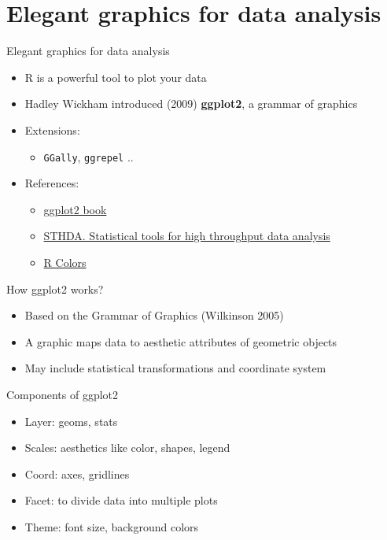 \documentclass[
  ignorenonframetext,
]{beamer}
\providecommand{\tightlist}{%
  \setlength{\itemsep}{0pt}\setlength{\parskip}{0pt}}
\begin{document}
\section{Elegant graphics for data
analysis}\label{elegant-graphics-for-data-analysis}

\begin{frame}[fragile]{Elegant graphics for data analysis}
\begin{itemize}
\tightlist
\item
  R is a powerful tool to plot your data
\item
  Hadley Wickham introduced (2009) \textbf{ggplot2}, a grammar of
  graphics
\item
  Extensions:

  \begin{itemize}
  \tightlist
  \item
    \texttt{GGally}, \texttt{ggrepel} ..
  \end{itemize}
\item
  References:

  \begin{itemize}
  \tightlist
  \item
    \href{https://ggplot2-book.org/}{ggplot2 book}
  \item
    \href{http://www.sthda.com/english/wiki/ggplot2-essentials}{STHDA.
    Statistical tools for high throughput data analysis}
  \item
    \href{http://www.stat.columbia.edu/~tzheng/files/Rcolor.pdf}{R
    Colors}
  \end{itemize}
\end{itemize}
\end{frame}

\begin{frame}{How ggplot2 works?}
\label{how-ggplot2-works}
\begin{itemize}
\tightlist
\item
  Based on the Grammar of Graphics (Wilkinson 2005)
\item
  A graphic maps data to aesthetic attributes of geometric objects
\item
  May include statistical transformations and coordinate system
\end{itemize}
\end{frame}

\begin{frame}{Components of ggplot2}
\label{components-of-ggplot2}
\begin{itemize}
\tightlist
\item
  Layer: geoms, stats
\item
  Scales: aesthetics like color, shapes, legend
\item
  Coord: axes, gridlines
\item
  Facet: to divide data into multiple plots
\item
  Theme: font size, background colors
\end{itemize}
\end{frame}
\end{document}
